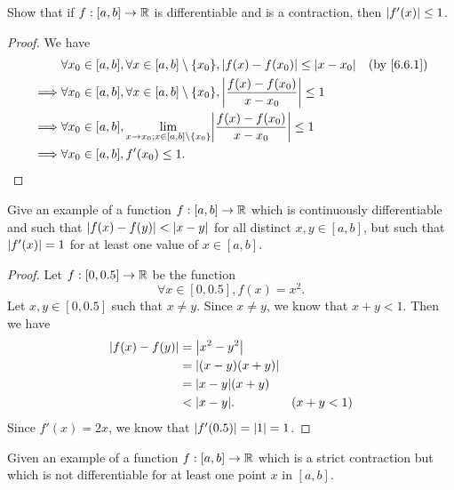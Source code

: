 \begin{ex}\label{ex:6.6.2}
  Show that if \(f : [a, b] \to \mathbb{R}\) is differentiable and is a contraction, then \(\left\lvert f'(x)\right\rvert \leq 1\).
\end{ex}

\begin{proof}
  We have
  \begin{align*}
             & \forall x_0 \in [a, b], \forall x \in [a, b] \setminus \set{x_0}, \abs{f(x) - f(x_0)} \leq \abs{x - x_0}                &  & \by{6.6.1} \\
    \implies & \forall x_0 \in [a, b], \forall x \in [a, b] \setminus \set{x_0}, \abs{\dfrac{f(x) - f(x_0)}{x - x_0}} \leq 1                           \\
    \implies & \forall x_0 \in [a, b], \lim_{x \to x_0 ; x \in [a, b] \setminus \set{x_0}} \abs{\dfrac{f(x) - f(x_0)}{x - x_0}} \leq 1                 \\
    \implies & \forall x_0 \in [a, b], f'(x_0) \leq 1.
  \end{align*}
\end{proof}

\begin{ex}\label{ex:6.6.3}
  Give an example of a function \(f : [a, b] \to \mathbb{R}\) which is continuously differentiable and such that \(\left\lvert f(x) - f(y)\right\rvert < \left\lvert x - y\right\rvert\) for all distinct \(x, y \in [a, b]\), but such that \(\left\lvert f'(x)\right\rvert = 1\) for at least one value of \(x \in [a, b]\).
\end{ex}

\begin{proof}
  Let \(f : [0, 0.5] \to \mathbb{R}\) be the function
  \[
    \forall x \in [0, 0.5], f(x) = x^2.
  \]
  Let \(x, y \in [0, 0.5]\) such that \(x \neq y\).
  Since \(x \neq y\), we know that \(x + y < 1\).
  Then we have
  \begin{align*}
    \abs{f(x) - f(y)} & = \abs{x^2 - y^2}                    \\
                      & = \abs{(x - y)(x + y)}               \\
                      & = \abs{x - y} (x + y)                \\
                      & < \abs{x - y}.         & (x + y < 1)
  \end{align*}
  Since \(f'(x) = 2x\), we know that \(\left\lvert f'(0.5)\right\rvert = \left\lvert1\right\rvert = 1\).
\end{proof}

\begin{ex}\label{ex:6.6.4}
  Given an example of a function \(f : [a, b] \to \mathbb{R}\) which is a strict contraction but which is not differentiable for at least one point \(x\) in \([a, b]\).
\end{ex}

